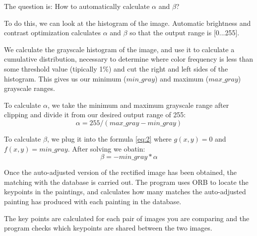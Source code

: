 \documentclass[10pt,twocolumn,letterpaper]{article}
\begin{document}
The question is: How to automatically calculate $\alpha$ and $\beta$?

To do this, we can look at the histogram of the image. Automatic brightness and contrast optimization calculates $\alpha$ and $\beta$ so that the output range is [0...255]. 

We calculate the grayscale histogram of the image, and use it to calculate a cumulative distribution, necessary to determine where color frequency is less than some threshold value (tipically 1\%) and cut the right and left sides of the histogram. This gives us our minimum ($min\_gray$) and maximum ($max\_gray$) grayscale ranges.

To calculate $\alpha$, we take the minimum and maximum grayscale range after clipping and divide it from our desired output range of 255:
\begin{equation} 
   \alpha = 255 / (max\_gray - min\_gray)
   \label{eq:3}
\end{equation}

To calculate $\beta$, we plug it into the formula \ref{eq:2} where $g(x, y)=0$ and $f(x, y)=min\_gray$. After solving we obatin:
\begin{equation} 
   \beta = -min\_gray * \alpha
   \label{eq:4}
\end{equation}

Once the auto-adjusted version of the rectified image has been obtained, the matching with the database is carried out. The program uses ORB to locate the keypoints in the paintings, and calculates how many matches the auto-adjusted painting has produced with each painting in the database.

The key points are calculated for each pair of images you are comparing and the program checks which keypoints are shared between the two images. 
\end{document}

